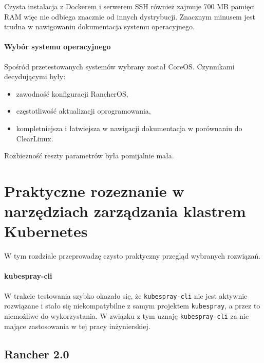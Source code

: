 \documentclass[a4paper,12pt,twoside,openany]{report}
\providecommand{\tightlist}{%
  \setlength{\itemsep}{0pt}\setlength{\parskip}{0pt}}
\newcommand{\passthrough}[1]{#1}
\begin{document}
Czysta instalacja z Dockerem i serwerem SSH również zajmuje 700 MB
pamięci RAM więc nie odbiega znacznie od innych dystrybucji. Znacznym
minusem jest trudna w nawigowaniu dokumentacja systemu operacyjnego.

\hypertarget{wybuxf3r-systemu-operacyjnego}{%
\subsubsection{Wybór systemu
operacyjnego}\label{wybuxf3r-systemu-operacyjnego}}

Spośród przetestowanych systemów wybrany został CoreOS. Czynnikami
decydującymi były:

\begin{itemize}
\tightlist
\item
  zawodność konfiguracji RancherOS,
\item
  częstotliwość aktualizacji oprogramowania,
\item
  kompletniejsza i łatwiejsza w nawigacji dokumentacja w porównaniu do
  ClearLinux.
\end{itemize}

Rozbieżność reszty parametrów była pomijalnie mała.

\hypertarget{praktyczne-rozeznanie-w-narzux119dziach-zarzux105dzania-klastrem-kubernetes}{%
\chapter{Praktyczne rozeznanie w narzędziach zarządzania klastrem
Kubernetes}\label{praktyczne-rozeznanie-w-narzux119dziach-zarzux105dzania-klastrem-kubernetes}}

W tym rozdziale przeprowadzę czysto praktyczny przegląd wybranych
rozwiązań.

\hypertarget{kubespray-cli}{%
\subsubsection{kubespray-cli}\label{kubespray-cli}}

W trakcie testowania szybko okazało się, że
\passthrough{\lstinline!kubespray-cli!} nie jest aktywnie rozwiązane i
stało się niekompatybilne z samym projektem
\passthrough{\lstinline!kubespray!}, a przez to niemożliwe do
wykorzystania. W związku z tym uznaję
\passthrough{\lstinline!kubespray-cli!} za nie mające zastosowania w tej
pracy inżynierskiej.

\hypertarget{rancher-2.0}{%
\section{Rancher 2.0}\label{rancher-2.0}}
\end{document}
